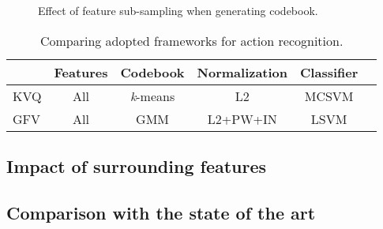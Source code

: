 \begin{figure*}[t!]
\begin{center}
\fbox{\rule{0pt}{1in} \rule{0.9\linewidth}{0pt}}
\end{center}
\caption{Effect of feature sub-sampling when generating codebook.}
\label{fig:feature_sampling}
\end{figure*}

\begin{table*}[h!]
\begin{center}
{
\begin{tabular}{ l| c c c c c }
\hline
& Features & Codebook & Normalization & Classifier \\
\hline
KVQ & All & \textit{k}-means & L2 & MCSVM \\
GFV & All & GMM & L2+PW+IN & LSVM \\
\hline
\end{tabular}
}
\end{center}
\caption{Comparing adopted frameworks for action recognition.}
\label{tab:frameworks}
\end{table*}






\subsection{Impact of surrounding features}
\subsection{Comparison with the state of the art}

